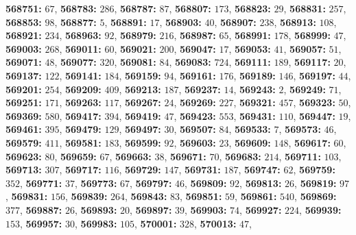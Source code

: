 \textsf{\bfseries 568751:} $67$, \textsf{\bfseries 568783:} $286$, \textsf{\bfseries 568787:} $87$, \textsf{\bfseries 568807:} $173$, \textsf{\bfseries 568823:} $29$, \textsf{\bfseries 568831:} $257$, \textsf{\bfseries 568853:} $98$, \textsf{\bfseries 568877:} $5$, \textsf{\bfseries 568891:} $17$, \textsf{\bfseries 568903:} $40$, \textsf{\bfseries 568907:} $238$, \textsf{\bfseries 568913:} $108$, \textsf{\bfseries 568921:} $234$, \textsf{\bfseries 568963:} $92$, \textsf{\bfseries 568979:} $216$, \textsf{\bfseries 568987:} $65$, \textsf{\bfseries 568991:} $178$, \textsf{\bfseries 568999:} $47$, \textsf{\bfseries 569003:} $268$, \textsf{\bfseries 569011:} $60$, \textsf{\bfseries 569021:} $200$, \textsf{\bfseries 569047:} $17$, \textsf{\bfseries 569053:} $41$, \textsf{\bfseries 569057:} $51$, \textsf{\bfseries 569071:} $48$, \textsf{\bfseries 569077:} $320$, \textsf{\bfseries 569081:} $84$, \textsf{\bfseries 569083:} $724$, \textsf{\bfseries 569111:} $189$, \textsf{\bfseries 569117:} $20$, \textsf{\bfseries 569137:} $122$, \textsf{\bfseries 569141:} $184$, \textsf{\bfseries 569159:} $94$, \textsf{\bfseries 569161:} $176$, \textsf{\bfseries 569189:} $146$, \textsf{\bfseries 569197:} $44$, \textsf{\bfseries 569201:} $254$, \textsf{\bfseries 569209:} $409$, \textsf{\bfseries 569213:} $187$, \textsf{\bfseries 569237:} $14$, \textsf{\bfseries 569243:} $2$, \textsf{\bfseries 569249:} $71$, \textsf{\bfseries 569251:} $171$, \textsf{\bfseries 569263:} $117$, \textsf{\bfseries 569267:} $24$, \textsf{\bfseries 569269:} $227$, \textsf{\bfseries 569321:} $457$, \textsf{\bfseries 569323:} $50$, \textsf{\bfseries 569369:} $580$, \textsf{\bfseries 569417:} $394$, \textsf{\bfseries 569419:} $47$, \textsf{\bfseries 569423:} $553$, \textsf{\bfseries 569431:} $110$, \textsf{\bfseries 569447:} $19$, \textsf{\bfseries 569461:} $395$, \textsf{\bfseries 569479:} $129$, \textsf{\bfseries 569497:} $30$, \textsf{\bfseries 569507:} $84$, \textsf{\bfseries 569533:} $7$, \textsf{\bfseries 569573:} $46$, \textsf{\bfseries 569579:} $411$, \textsf{\bfseries 569581:} $183$, \textsf{\bfseries 569599:} $92$, \textsf{\bfseries 569603:} $23$, \textsf{\bfseries 569609:} $148$, \textsf{\bfseries 569617:} $60$, \textsf{\bfseries 569623:} $80$, \textsf{\bfseries 569659:} $67$, \textsf{\bfseries 569663:} $38$, \textsf{\bfseries 569671:} $70$, \textsf{\bfseries 569683:} $214$, \textsf{\bfseries 569711:} $103$, \textsf{\bfseries 569713:} $307$, \textsf{\bfseries 569717:} $116$, \textsf{\bfseries 569729:} $147$, \textsf{\bfseries 569731:} $187$, \textsf{\bfseries 569747:} $62$, \textsf{\bfseries 569759:} $352$, \textsf{\bfseries 569771:} $37$, \textsf{\bfseries 569773:} $67$, \textsf{\bfseries 569797:} $46$, \textsf{\bfseries 569809:} $92$, \textsf{\bfseries 569813:} $26$, \textsf{\bfseries 569819:} $97$, \textsf{\bfseries 569831:} $156$, \textsf{\bfseries 569839:} $264$, \textsf{\bfseries 569843:} $83$, \textsf{\bfseries 569851:} $59$, \textsf{\bfseries 569861:} $540$, \textsf{\bfseries 569869:} $377$, \textsf{\bfseries 569887:} $26$, \textsf{\bfseries 569893:} $20$, \textsf{\bfseries 569897:} $39$, \textsf{\bfseries 569903:} $74$, \textsf{\bfseries 569927:} $224$, \textsf{\bfseries 569939:} $153$, \textsf{\bfseries 569957:} $30$, \textsf{\bfseries 569983:} $105$, \textsf{\bfseries 570001:} $328$, \textsf{\bfseries 570013:} $47$, 
